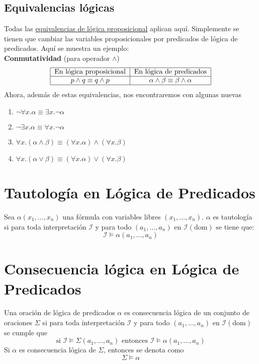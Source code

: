 \documentclass[../main.tex]{subfiles}
\begin{document}
\subsection{Equivalencias lógicas}
Todas las \hyperref[sec:equiv_logica_util]{equivalencias de lógica proposicional} aplican aquí. Simplemente se tienen que cambiar las variables proposicionales por predicados de lógica de predicados. Aquí se muestra un ejemplo:\\
\textbf{Conmutatividad} (para operador $\wedge$)
\[    
    \begin{tabular}{|c|c|}
        \hline
        En lógica proposicional & En lógica de predicados\\ \hline
        $p \wedge{} q \equiv{} q \wedge{} p$ & $\alpha{} \wedge{} \beta{} \equiv{} \beta{} \wedge{} \alpha{}$ \\ \hline
    \end{tabular}
\]
Ahora, además de estas equivalencias, nos encontraremos con algunas nuevas
\begin{enumerate}
    \item $\neg \forall x . \alpha \equiv \exists x . \neg \alpha$
    \item $\neg \exists x . \alpha \equiv \forall x . \neg \alpha$
    \item $\forall x . (\alpha \wedge \beta) \equiv (\forall x . \alpha) \wedge (\forall x . \beta)$
    \item $\forall x . (\alpha \vee \beta) \equiv (\forall x . \alpha) \vee (\forall x . \beta)$
\end{enumerate}

\section{Tautología en Lógica de Predicados}
Sea $\alpha{}(x_{1}, \ldots, x_{n})$ una fórmula con variables libres $(x_{1}, \ldots, x_{n})$. $\alpha$ es tautología si para toda interpretación $\mathcal{I}$ y para todo $(a_{1}, \ldots, a_{n})$ en $\mathcal{I}(\text{dom})$ se tiene que:
$$\mathcal{I} \models \alpha{}(a_{1}, \ldots, a_{n})$$

\section{Consecuencia lógica en Lógica de Predicados}
Una oración de lógica de predicados $\alpha$ es consecuencia lógica de un conjunto de oraciones $\Sigma$ si para toda interpretación $\mathcal{I}$ y para todo $(a_{1}, \ldots, a_{n})$ en $\mathcal{I}(\text{dom})$ se cumple que
$$\text{si } \mathcal{I} \models \Sigma{}(a_{1}, \ldots, a_{n}) \text{ entonces } \mathcal{I} \models \alpha{}(a_{1}, \ldots, a_{n})$$
Si $\alpha$ es consecuencia lógica de $\Sigma$, entonces se denota como
$$\Sigma \models \alpha$$
\end{document}
